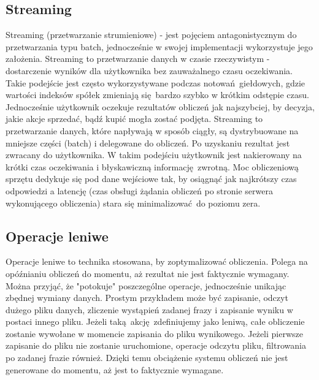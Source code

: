 \subsection{Streaming}\label{streaming_subsection}
Streaming (przetwarzanie strumieniowe) - jest pojęciem antagonistycznym do przetwarzania typu batch, jednocześnie w swojej implementacji wykorzystuje jego założenia. Streaming to przetwarzanie danych w czasie rzeczywistym - dostarczenie wyników dla użytkownika bez zauważalnego czasu oczekiwania. Takie podejście jest często wykorzystywane podczas notowań giełdowych, gdzie wartości indeksów spółek zmieniają się bardzo szybko w krótkim odstępie czasu. Jednocześnie użytkownik oczekuje rezultatów obliczeń jak najszybciej, by decyzja, jakie akcje sprzedać, bądź kupić mogła zostać podjęta. Streaming to przetwarzanie danych, które napływają w sposób ciągły, są dystrybuowane na mniejsze części (batch) i delegowane do obliczeń. Po uzyskaniu rezultat jest zwracany do użytkownika. W takim podejściu użytkownik jest nakierowany na krótki czas oczekiwania i błyskawiczną informację zwrotną. Moc obliczeniową sprzętu dedykuje się pod dane wejściowe tak, by osiągnąć jak najkrótszy czas odpowiedzi a latencję (czas obsługi żądania obliczeń po stronie serwera wykonującego obliczenia) stara się minimalizować do poziomu zera.
\subsection{Operacje leniwe}
Operacje leniwe to technika stosowana, by zoptymalizować obliczenia. Polega na opóźnianiu obliczeń do momentu, aż rezultat nie jest faktycznie wymagany. Można przyjąć, że "potokuje" poszczególne operacje, jednocześnie unikając zbędnej wymiany danych. Prostym przykładem może być zapisanie, odczyt dużego pliku danych, zliczenie wystąpień zadanej frazy i zapisanie wyniku w postaci innego pliku. Jeżeli taką akcję zdefiniujemy jako leniwą, całe obliczenie zostanie wywołane w momencie zapisania do pliku wynikowego. Jeżeli pierwsze zapisanie do pliku nie zostanie uruchomione, operacje odczytu pliku, filtrowania po zadanej frazie również. Dzięki temu obciążenie systemu obliczeń nie jest generowane do momentu, aż jest to faktycznie wymagane.

